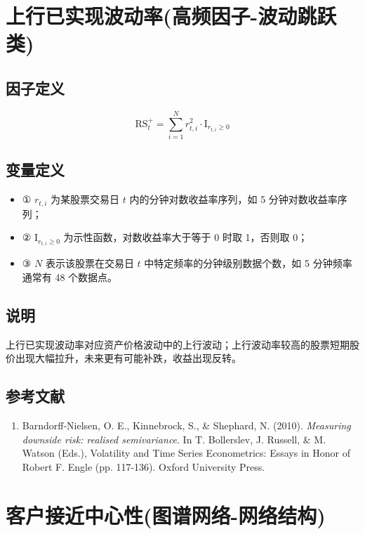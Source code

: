 \documentclass{article}
\begin{document}
\section{上行已实现波动率(高频因子-波动跳跃类)}

\subsection{因子定义}
\begin{equation}
    \mathrm{RS}_t^+ = \sum_{i=1}^N r_{t,i}^2 \cdot \mathrm{I}_{r_{t,i} \geq 0}
\end{equation}

\subsection{变量定义}
\begin{itemize}
    \item ① \( r_{t,i} \) 为某股票交易日 \( t \) 内的分钟对数收益率序列，如 5 分钟对数收益率序列；
    \item ② \( \mathrm{I}_{r_{t,i} \geq 0} \) 为示性函数，对数收益率大于等于 0 时取 1，否则取 0；
    \item ③ \( N \) 表示该股票在交易日 \( t \) 中特定频率的分钟级别数据个数，如 5 分钟频率通常有 48 个数据点。
\end{itemize}

\subsection{说明}
上行已实现波动率对应资产价格波动中的上行波动；上行波动率较高的股票短期股价出现大幅拉升，未来更有可能补跌，收益出现反转。

\subsection{参考文献}
\begin{enumerate}
    \item Barndorff-Nielsen, O. E., Kinnebrock, S., \& Shephard, N. (2010). \textit{Measuring downside risk: realised semivariance}. In T. Bollerslev, J. Russell, \& M. Watson (Eds.), Volatility and Time Series Econometrics: Essays in Honor of Robert F. Engle (pp. 117-136). Oxford University Press.
\end{enumerate}

\section{客户接近中心性(图谱网络-网络结构)}
\end{document}
